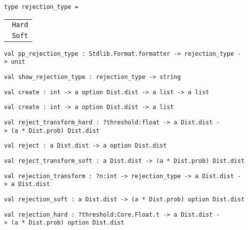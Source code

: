 \protect\hyperlink{type-rejectionux5ftype}{}\texttt{type\ rejection\_type}\texttt{\ =\ }

\begin{longtable}[c]{@{}l@{}}
\toprule
\protect\hyperlink{type-rejectionux5ftype.Hard}{}\texttt{\textbar{}\ }\texttt{Hard}\tabularnewline
\protect\hyperlink{type-rejectionux5ftype.Soft}{}\texttt{\textbar{}\ }\texttt{Soft}\tabularnewline
\bottomrule
\end{longtable}

\protect\hyperlink{val-ppux5frejectionux5ftype}{}\texttt{val\ pp\_rejection\_type\ :\ Stdlib.Format.formatter\ -\textgreater{}\ rejection\_type\ -\textgreater{}\ unit}

\protect\hyperlink{val-showux5frejectionux5ftype}{}\texttt{val\ show\_rejection\_type\ :\ rejection\_type\ -\textgreater{}\ string}

\protect\hyperlink{val-createux27}{}\texttt{val\ create\textquotesingle{}\ :\ int\ -\textgreater{}\ \textquotesingle{}a\ option\ Dist.dist\ -\textgreater{}\ \textquotesingle{}a\ list\ -\textgreater{}\ \textquotesingle{}a\ list}

\protect\hyperlink{val-create}{}\texttt{val\ create\ :\ int\ -\textgreater{}\ \textquotesingle{}a\ option\ Dist.dist\ -\textgreater{}\ \textquotesingle{}a\ list}

\protect\hyperlink{val-rejectux5ftransformux5fhard}{}\texttt{val\ reject\_transform\_hard\ :\ ?⁠threshold:float\ -\textgreater{}\ \textquotesingle{}a\ Dist.dist\ -\textgreater{}\ (\textquotesingle{}a\ *\ Dist.prob)\ Dist.dist}

\protect\hyperlink{val-rejectux27ux27}{}\texttt{val\ reject\textquotesingle{}\textquotesingle{}\ :\ \textquotesingle{}a\ Dist.dist\ -\textgreater{}\ \textquotesingle{}a\ option\ Dist.dist}

\protect\hyperlink{val-rejectux5ftransformux5fsoft}{}\texttt{val\ reject\_transform\_soft\ :\ \textquotesingle{}a\ Dist.dist\ -\textgreater{}\ (\textquotesingle{}a\ *\ Dist.prob)\ Dist.dist}

\protect\hyperlink{val-rejectionux5ftransform}{}\texttt{val\ rejection\_transform\ :\ ?⁠n:int\ -\textgreater{}\ rejection\_type\ -\textgreater{}\ \textquotesingle{}a\ Dist.dist\ -\textgreater{}\ \textquotesingle{}a\ Dist.dist}

\protect\hyperlink{val-rejectionux5fsoft}{}\texttt{val\ rejection\_soft\ :\ \textquotesingle{}a\ Dist.dist\ -\textgreater{}\ (\textquotesingle{}a\ *\ Dist.prob)\ option\ Dist.dist}

\protect\hyperlink{val-rejectionux5fhard}{}\texttt{val\ rejection\_hard\ :\ ?⁠threshold:Core.Float.t\ -\textgreater{}\ \textquotesingle{}a\ Dist.dist\ -\textgreater{}\ (\textquotesingle{}a\ *\ Dist.prob)\ option\ Dist.dist}

